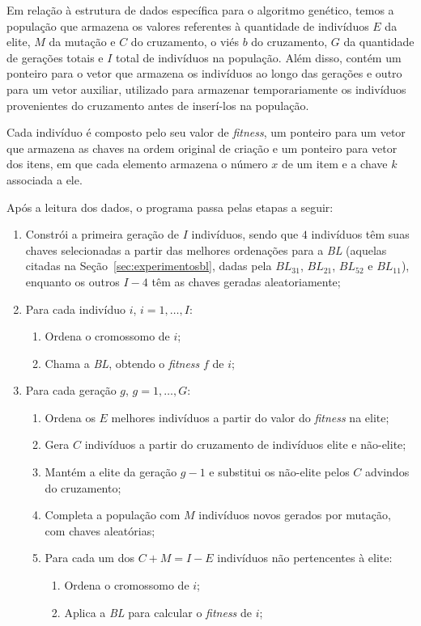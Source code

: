 \documentclass{article}
\begin{document}
Em relação à estrutura de dados específica para o algoritmo genético, temos a população que armazena os valores referentes à quantidade de indivíduos $E$ da elite, $M$ da mutação e $C$ do cruzamento, o viés $b$ do cruzamento, $G$ da quantidade de gerações totais e $I$ total de indivíduos na população. Além disso, contém um ponteiro para o vetor que armazena os indivíduos ao longo das gerações e outro para um vetor auxiliar, utilizado para armazenar temporariamente os indivíduos provenientes do cruzamento antes de inserí-los na população.

Cada indivíduo é composto pelo seu valor de {\it fitness}, um ponteiro para um vetor que armazena as chaves na ordem original de criação e um ponteiro para vetor dos itens, em que cada elemento armazena o número $x$ de um item e a chave $k$ associada a ele.

Após a leitura dos dados, o programa passa pelas etapas a seguir:

\begin{enumerate}
    \item Constrói a primeira geração de $I$ indivíduos, sendo que $4$ indivíduos têm suas chaves selecionadas a partir das melhores ordenações para a {\it BL} (aquelas citadas na Seção~\ref{sec:experimentosbl}, dadas pela $BL_{31}$, $BL_{21}$, $BL_{52}$ e $BL_{11}$), enquanto os outros $I-4$ têm as chaves geradas aleatoriamente;
    \item Para cada indivíduo $i$, $i = 1, \dots, I$:
    \begin{enumerate}
        \item Ordena o cromossomo de $i$;
        \item Chama a {\it BL}, obtendo o {\it fitness} $f$ de $i$;
    \end{enumerate}
    \item Para cada geração $g$, $g = 1, \dots, G$:
    \begin{enumerate}
        \item Ordena os $E$ melhores indivíduos a partir do valor do {\it fitness} na elite;
        \item Gera $C$ indivíduos a partir do cruzamento de indivíduos elite e não-elite;
        \item Mantém a elite da geração $g-1$ e substitui os não-elite pelos $C$ advindos do cruzamento;
        \item Completa a população com $M$ indivíduos novos gerados por mutação, com chaves aleatórias;
        \item Para cada um dos $C+M = I-E$ indivíduos não pertencentes à elite:
        \begin{enumerate}
            \item Ordena o cromossomo de $i$;
            \item Aplica a {\it BL} para calcular o {\it fitness} de $i$;
        \end{enumerate}
    \end{enumerate}
\end{enumerate}
\end{document}
